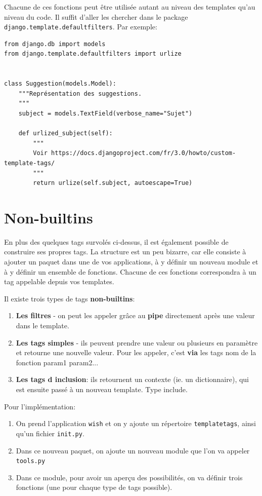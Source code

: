 \documentclass[11pt]{amsbook}
\begin{document}
Chacune de ces fonctions peut être utilisée autant au niveau des templates qu’au niveau du code. Il suffit d’aller les chercher dans le package \texttt{django.template.defaultfilters}. Par exemple:


\begin{verbatim}
from django.db import models
from django.template.defaultfilters import urlize


class Suggestion(models.Model):
    """Représentation des suggestions.
    """
    subject = models.TextField(verbose_name="Sujet")

    def urlized_subject(self):
        """
        Voir https://docs.djangoproject.com/fr/3.0/howto/custom-template-tags/
        """
        return urlize(self.subject, autoescape=True)
\end{verbatim}

\hypertarget{x-non-builtins}{\section{Non-builtins}}
En plus des quelques tags survolés ci-dessus, il est également possible de construire ses propres tags. La structure est un peu bizarre, car elle consiste à ajouter un paquet dans une de vos applications, à y définir un nouveau module et à y définir un ensemble de fonctions. Chacune de ces fonctions correspondra à un tag appelable depuis vos templates.


Il existe trois types de tags \textbf{non-builtins}:


\begin{enumerate}

\item \textbf{Les filtres} - on peut les appeler grâce au \textbf{pipe} directement après une valeur dans le template.

\item \textbf{Les tags simples} - ils peuvent prendre une valeur ou plusieurs en paramètre et retourne une nouvelle valeur. Pour les appeler, c’est \textbf{via} les tags nom de la fonction param1 param2...

\item \textbf{Les tags d inclusion}: ils retournent un contexte (ie. un dictionnaire), qui est ensuite passé à un nouveau template. Type include.

\end{enumerate}


Pour l’implémentation:


\begin{enumerate}

\item On prend l’application \texttt{wish} et on y ajoute un répertoire \texttt{templatetags}, ainsi qu’un fichier \texttt{init.py}.

\item{Dans ce nouveau paquet, on ajoute un nouveau module que l’on va appeler \texttt{tools.py}}

\item{Dans ce module, pour avoir un aperçu des possibilités, on va définir trois fonctions (une pour chaque type de tags possible).}

\end{enumerate}
\end{document}
